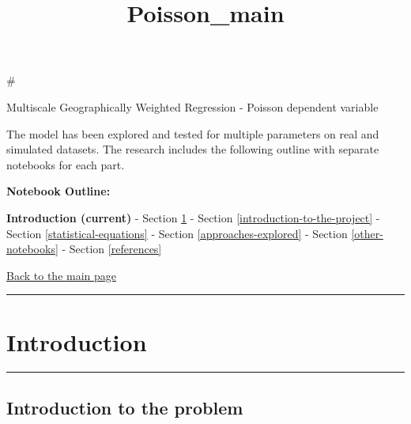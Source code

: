 \documentclass[11pt]{article}
\title{Poisson\_main}
\begin{document}
    
    
    \maketitle
    
    

    
    \#

Multiscale Geographically Weighted Regression - Poisson dependent
variable

The model has been explored and tested for multiple parameters on real
and simulated datasets. The research includes the following outline with
separate notebooks for each part.

\textbf{Notebook Outline:}

\textbf{Introduction (current)} - Section \ref{introduction} -
Section \ref{introduction-to-the-project} -
Section \ref{statistical-equations} - Section \ref{approaches-explored}
- Section \ref{other-notebooks} - Section \ref{references}

    \href{https://mehak-sachdeva.github.io/MGWR_book/}{Back to the main
page}

    \begin{center}\rule{0.5\linewidth}{\linethickness}\end{center}

\section{Introduction}\label{introduction}

\begin{center}\rule{0.5\linewidth}{\linethickness}\end{center}

\subsection{Introduction to the
problem}\label{introduction-to-the-problem}
\end{document}
